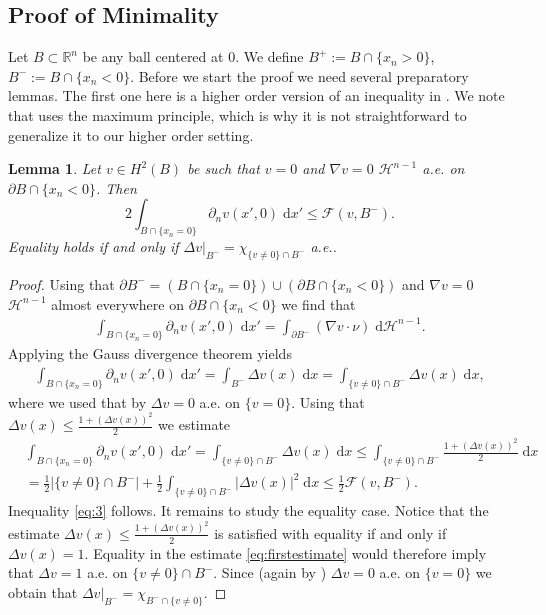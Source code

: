 \documentclass[twoside,11pt]{article}
\newtheorem{lemma}{Lemma}
\theoremstyle{definition}
\begin{document}
\subsection{Proof of Minimality}
 Let $B \subset \mathbb{R}^n$ be any ball centered at $0$. We define $B^+:= B \cap \{x_n > 0 \}$, $B^- := B \cap \{x_n < 0 \}.$ Before we start the proof we need several preparatory lemmas. The first one here is a higher order version of an inequality in \cite[Proof of Lemma 2.13]{Velichkov}. We note that \cite[Lemma 2.13]{Velichkov} uses the maximum principle, which is why it is not straightforward to generalize it to our higher order setting.
\begin{lemma}\label{lem:1}
    Let $v \in H^{2}(B)$ be such that $v = 0$ and $\nabla v = 0$ $\mathcal{H}^{n-1}$ a.e. on $\partial B \cap \{ x_n < 0 \}$. Then 
    \begin{equation}\label{eq:3}
        2   \int_{B \cap \{x_n = 0 \}} \partial_n v(x',0) \; \mathrm{d}x'  \leq  \mathcal{F}(v,B^-).
    \end{equation}
    Equality holds if and only if $\Delta v \vert_{B^-} = \chi_{\{v \neq 0 \} \cap B^- }$ a.e..
\end{lemma}
\begin{proof}
Using that $\partial B^- = (B \cap \{x_n = 0 \}) \cup (\partial B \cap \{ x_n < 0 \})$ and $\nabla v = 0$ $\mathcal{H}^{n-1}$ almost everywhere  on  $\partial B \cap \{ x_n < 0 \}$ we find that
    \begin{align*}
          \int_{B \cap \{x_n = 0 \}} \partial_n v(x',0) \; \mathrm{d}x' =  \int_{\partial B^-} (\nabla v \cdot \nu ) \; \mathrm{d}\mathcal{H}^{n-1}.
    \end{align*}
     Applying the Gauss divergence theorem yields
    \begin{align*}
        \int_{B \cap \{x_n = 0 \}} \partial_n v(x',0) \; \mathrm{d}x' = \int_{B^-} \Delta v(x) \; \mathrm{d}x = \int_{\{ v \neq 0 \} \cap B^- } \Delta v(x) \; \mathrm{d}x,
    \end{align*}
    where we used that by \cite[Lemma 4]{GMMathAnn} $\Delta v = 0$ a.e. on $\{ v =  0 \}$. Using that $\Delta v(x) \leq \frac{1 + (\Delta v(x))^2}{2}$ we estimate
    \begin{align}
       &    \int_{B \cap \{x_n = 0 \}} \partial_n v(x',0) \; \mathrm{d}x'   =  \int_{\{ v \neq 0 \} \cap B^- } \Delta v(x) \; \mathrm{d}x   \leq  \int_{\{ v \neq 0 \} \cap B^-} \frac{1 + (\Delta v(x))^2}{2}\; \mathrm{d}x  \label{eq:firstestimate} \\ & = \frac{1}{2} |\{ v \neq 0 \} \cap B^- | +  \frac{1}{2} \int_{\{v \neq 0 \} \cap B^- } |\Delta v(x)|^2 \; \mathrm{d}x \leq \frac{1}{2} \mathcal{F}(v,B^-). \nonumber 
    \end{align}
    Inequality \ref{eq:3} follows. It remains to study the equality case. Notice that the estimate $\Delta v(x) \leq \frac{1 + (\Delta v(x))^2}{2}$ is satisfied with equality if and only if $\Delta v(x) = 1$. Equality in the estimate \eqref{eq:firstestimate} would therefore imply that $\Delta v = 1$ a.e. on $\{ v \neq 0 \} \cap B^-$. Since (again by \cite[Lemma 4]{GMMathAnn}) $\Delta v = 0$ a.e. on $\{ v = 0 \}$ we obtain that $\Delta v \vert_{B^-} = \chi_{B^- \cap \{ v \neq 0 \}}.$ 
\end{proof}
\end{document}
